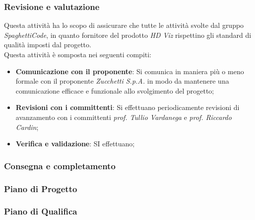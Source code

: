\subsubsection{Revisione e valutazione}
\label{par:revisione_e_valutazione}
Questa attività ha lo scopo di assicurare che tutte le attività svolte dal gruppo \emph{SpaghettiCode}, in quanto fornitore del prodotto
\emph{HD Viz} rispettino gli standard di qualità imposti dal progetto.\\
Questa attività è somposta nei seguenti compiti:
\begin{itemize}
    \item \textbf{Comunicazione con il proponente}: Si comunica in maniera più o meno formale con il proponente \emph{Zucchetti S.p.A.} in
    modo da mantenere una comunicazione efficace e funzionale allo svolgimento del progetto;
    \item \textbf{Revisioni con i committenti}: Si effettuano periodicamente revisioni di avanzamento con i committenti \emph{prof. Tullio
    Vardanega} e \emph{prof. Riccardo Cardin};
    \item \textbf{Verifica e validazione}: SI effettuano;

\end{itemize}

\subsubsection{Consegna e completamento}
\label{par:Iniziazione}







\subsubsection{Piano di Progetto}
\label{par:pdp}




\subsubsection{Piano di Qualifica}

